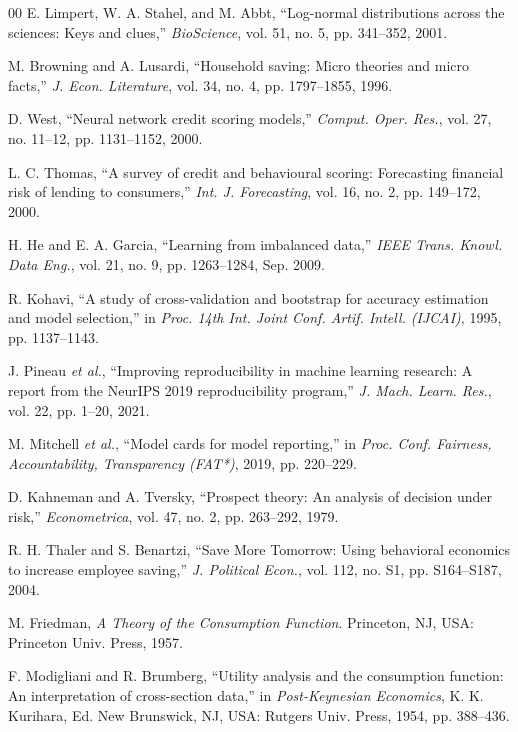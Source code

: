 \documentclass[journal]{./IEEE/IEEEtran}
\begin{document}
\begin{thebibliography}{00}
 E. Limpert, W. A. Stahel, and M. Abbt, ``Log-normal distributions across the sciences: Keys and clues,'' \emph{BioScience}, vol. 51, no. 5, pp. 341--352, 2001.

 M. Browning and A. Lusardi, ``Household saving: Micro theories and micro facts,'' \emph{J. Econ. Literature}, vol. 34, no. 4, pp. 1797--1855, 1996.

 D. West, ``Neural network credit scoring models,'' \emph{Comput. Oper. Res.}, vol. 27, no. 11--12, pp. 1131--1152, 2000.

 L. C. Thomas, ``A survey of credit and behavioural scoring: Forecasting financial risk of lending to consumers,'' \emph{Int. J. Forecasting}, vol. 16, no. 2, pp. 149--172, 2000.

 H. He and E. A. Garcia, ``Learning from imbalanced data,'' \emph{IEEE Trans. Knowl. Data Eng.}, vol. 21, no. 9, pp. 1263--1284, Sep. 2009.

 R. Kohavi, ``A study of cross-validation and bootstrap for accuracy estimation and model selection,'' in \emph{Proc. 14th Int. Joint Conf. Artif. Intell. (IJCAI)}, 1995, pp. 1137--1143.

 J. Pineau \emph{et al.}, ``Improving reproducibility in machine learning research: A report from the NeurIPS 2019 reproducibility program,'' \emph{J. Mach. Learn. Res.}, vol. 22, pp. 1--20, 2021.

 M. Mitchell \emph{et al.}, ``Model cards for model reporting,'' in \emph{Proc. Conf. Fairness, Accountability, Transparency (FAT*)}, 2019, pp. 220--229.

 D. Kahneman and A. Tversky, ``Prospect theory: An analysis of decision under risk,'' \emph{Econometrica}, vol. 47, no. 2, pp. 263--292, 1979.

 R. H. Thaler and S. Benartzi, ``Save More Tomorrow: Using behavioral economics to increase employee saving,'' \emph{J. Political Econ.}, vol. 112, no. S1, pp. S164--S187, 2004.

 M. Friedman, \emph{A Theory of the Consumption Function}. Princeton, NJ, USA: Princeton Univ. Press, 1957.

 F. Modigliani and R. Brumberg, ``Utility analysis and the consumption function: An interpretation of cross-section data,'' in \emph{Post-Keynesian Economics}, K. K. Kurihara, Ed. New Brunswick, NJ, USA: Rutgers Univ. Press, 1954, pp. 388--436.


\end{thebibliography}
\end{document}

